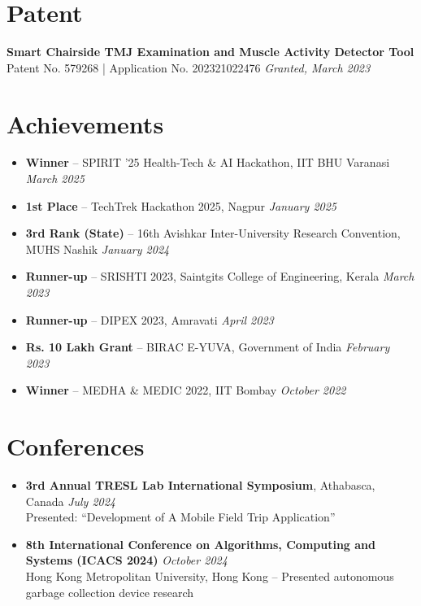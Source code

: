 \documentclass[10pt, letterpaper]{article}
\begin{document}
\section{Patent}
\textbf{Smart Chairside TMJ Examination and Muscle Activity Detector Tool} \\
Patent No. 579268 \quad | \quad Application No. 202321022476 \hfill \textit{Granted, March 2023}

\section{Achievements}
\begin{itemize}[leftmargin=*, noitemsep, topsep=2pt]
    \item \textbf{Winner} -- SPIRIT '25 Health-Tech \& AI Hackathon, IIT BHU Varanasi \hfill \textit{March 2025}
    \item \textbf{1st Place} -- TechTrek Hackathon 2025, Nagpur \hfill \textit{January 2025}
    \item \textbf{3rd Rank (State)} -- 16th Avishkar Inter-University Research Convention, MUHS Nashik \hfill \textit{January 2024}
    \item \textbf{Runner-up} -- SRISHTI 2023, Saintgits College of Engineering, Kerala \hfill \textit{March 2023}
    \item \textbf{Runner-up} -- DIPEX 2023, Amravati \hfill \textit{April 2023}
    \item \textbf{Rs. 10 Lakh Grant} -- BIRAC E-YUVA, Government of India \hfill \textit{February 2023}
    \item \textbf{Winner} -- MEDHA \& MEDIC 2022, IIT Bombay \hfill \textit{October 2022}
\end{itemize}

\section{Conferences}
\begin{itemize}[leftmargin=*, noitemsep, topsep=2pt]
    \item \textbf{3rd Annual TRESL Lab International Symposium}, Athabasca, Canada \hfill \textit{July 2024} \\
    Presented: ``Development of A Mobile Field Trip Application''
    \item \textbf{8th International Conference on Algorithms, Computing and Systems (ICACS 2024)} \hfill \textit{October 2024} \\
    Hong Kong Metropolitan University, Hong Kong -- Presented autonomous garbage collection device research
\end{itemize}
\end{document}
